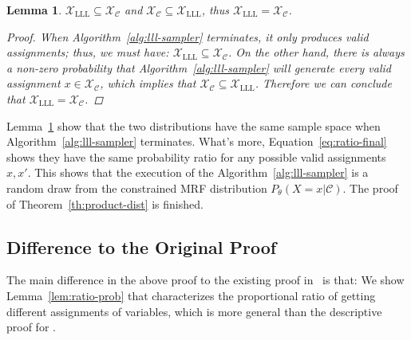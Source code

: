 \documentclass[letterpaper]{article} %
\newtheorem{lemma}{Lemma}
\begin{document}
\begin{lemma}\label{lem:space}
$\mathcal{X}_{\text{LLL}}\subseteq\mathcal{X}_{\mathcal{C}}$ and $\mathcal{X}_{\mathcal{C}}\subseteq\mathcal{X}_{\text{LLL}}$, thus $\mathcal{X}_{\text{LLL}}=\mathcal{X}_{\mathcal{C}}$.
\begin{proof}
When Algorithm~\ref{alg:lll-sampler} terminates, it only produces valid assignments; thus, we must have: $\mathcal{X}_{\text{LLL}}\subseteq\mathcal{X}_{\mathcal{C}}$. On the other hand,   there is always a non-zero probability that Algorithm~\ref{alg:lll-sampler} will generate every valid assignment $x\in\mathcal{X}_\mathcal{C}$, which implies that $\mathcal{X}_{\mathcal{C}}\subseteq\mathcal{X}_{\text{LLL}}$. Therefore we can conclude that $\mathcal{X}_{\text{LLL}}=\mathcal{X}_{\mathcal{C}}$.
\end{proof}
\end{lemma}
Lemma~\ref{lem:space} show that the two distributions have the same sample space when Algorithm~\ref{alg:lll-sampler} terminates. What's more, Equation~\eqref{eq:ratio-final} shows they have the same probability ratio for any possible valid assignments $x,x'$. This shows that the execution of the Algorithm~\ref{alg:lll-sampler} is a random draw from the constrained MRF distribution $P_{\theta}(X=x|\mathcal{C})$. The proof of Theorem~\ref{th:product-dist} is finished. 

\subsection{Difference to the Original Proof} 
 The main difference in the above proof to the existing proof in~\cite[Lemma 7]{DBLP:journals/jacm/GuoJL19} is that: We  show Lemma~\ref{lem:ratio-prob} that characterizes the proportional ratio of getting different assignments of variables, which is more general than the descriptive proof for \citet[Lemma 7]{DBLP:journals/jacm/GuoJL19}.
\end{document}
